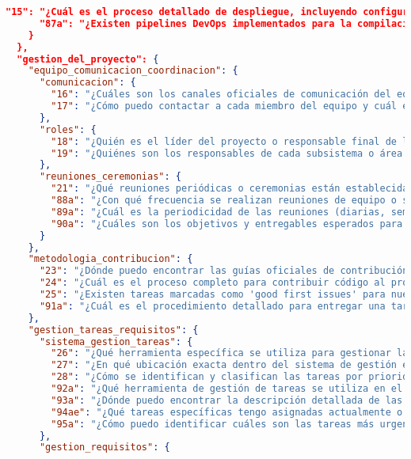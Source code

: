 \begin{lstlisting}[language=json, caption={Listado de elicitación de preguntas procesadas y clasificadas}, label={listado:preguntas}]
      "15": "¿Cuál es el proceso detallado de despliegue, incluyendo configuraciones, tecnologías y herramientas utilizadas?",
      "87a": "¿Existen pipelines DevOps implementados para la compilación y despliegue en los diferentes entornos?"
    }
  },
  "gestion_del_proyecto": {
    "equipo_comunicacion_coordinacion": {
      "comunicacion": {
        "16": "¿Cuáles son los canales oficiales de comunicación del equipo (chat, email, videollamadas)?",
        "17": "¿Cómo puedo contactar a cada miembro del equipo y cuál es su rol o área de responsabilidad?"
      },
      "roles": {
        "18": "¿Quién es el líder del proyecto o responsable final de las decisiones?",
        "19": "¿Quiénes son los responsables de cada subsistema o área del proyecto y cuáles son sus responsabilidades específicas?"
      },
      "reuniones_ceremonias": {
        "21": "¿Qué reuniones periódicas o ceremonias están establecidas en el proyecto y cuál es su propósito?",
        "88a": "¿Con qué frecuencia se realizan reuniones de equipo o seguimiento del proyecto?",
        "89a": "¿Cuál es la periodicidad de las reuniones (diarias, semanales, etc.) y su duración estimada?",
        "90a": "¿Cuáles son los objetivos y entregables esperados para cada tipo de reunión?"
      }
    },
    "metodologia_contribucion": {
      "23": "¿Dónde puedo encontrar las guías oficiales de contribución al proyecto?",
      "24": "¿Cuál es el proceso completo para contribuir código al proyecto, desde la asignación hasta la integración?",
      "25": "¿Existen tareas marcadas como 'good first issues' para nuevos contribuyentes? ¿Dónde puedo encontrarlas?",
      "91a": "¿Cuál es el procedimiento detallado para entregar una tarea completada (revisión, validación, merge)?"
    },
    "gestion_tareas_requisitos": {
      "sistema_gestion_tareas": {
        "26": "¿Qué herramienta específica se utiliza para gestionar las tareas del proyecto (Jira, Trello, GitHub Projects, etc.)?",
        "27": "¿En qué ubicación exacta dentro del sistema de gestión están descritas las tareas pendientes?",
        "28": "¿Cómo se identifican y clasifican las tareas por prioridad o urgencia?",
        "92a": "¿Qué herramienta de gestión de tareas se utiliza en el proyecto y cómo accedo a ella?",
        "93a": "¿Dónde puedo encontrar la descripción detallada de las tareas asignadas o disponibles?",
        "94ae": "¿Qué tareas específicas tengo asignadas actualmente o debo realizar?",
        "95a": "¿Cómo puedo identificar cuáles son las tareas más urgentes o prioritarias en este momento?"
      },
      "gestion_requisitos": {

\end{lstlisting}
